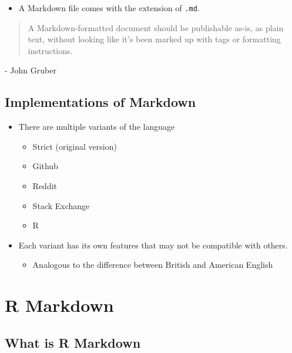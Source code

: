 \documentclass[
  11pt,
]{book}
\providecommand{\tightlist}{%
  \setlength{\itemsep}{0pt}\setlength{\parskip}{0pt}}
\begin{document}
\begin{itemize}
\tightlist
\item
  A Markdown file comes with the extension of \texttt{.md}.
\end{itemize}

\hfill\break

\begin{quote}
A Markdown-formatted document should be publishable as-is, as plain text, without looking like it's been marked up with tags or formatting instructions.
\end{quote}

\hfill - John Gruber

\hypertarget{implementations-of-markdown}{%
\subsection{Implementations of Markdown}\label{implementations-of-markdown}}

\begin{itemize}
\tightlist
\item
  There are multiple variants of the language

  \begin{itemize}
  \tightlist
  \item
    Strict (original version)
  \item
    Github
  \item
    Reddit
  \item
    Stack Exchange
  \item
    R
  \end{itemize}
\item
  Each variant has its own features that may not be compatible with others.

  \begin{itemize}
  \tightlist
  \item
    Analogous to the difference between British and American English
  \end{itemize}
\end{itemize}

\hypertarget{r-markdown}{%
\section{R Markdown}\label{r-markdown}}

\hypertarget{what-is-r-markdown}{%
\subsection{What is R Markdown}\label{what-is-r-markdown}}
\end{document}
